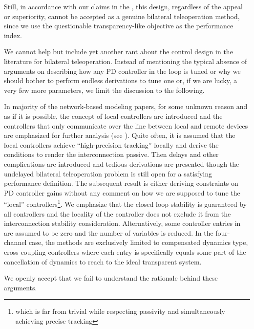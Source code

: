 Still, in accordance with our claims in the , this design, regardless of the appeal or superiority, cannot be accepted as 
a genuine bilateral teleoperation method, since we use the questionable transparency-like objective as the performance index.

We cannot help but include yet another rant about the control design in the literature for bilateral teleoperation. Instead of mentioning the typical 
absence of arguments on describing how any PD controller in the loop is tuned or why we should bother to perform endless derivations to tune one 
or, if we are lucky, a very few more parameters, we limit the discussion to the following. 

In majority of the network-based modeling papers, for some unknown reason and as if it is possible, the concept of local controllers are introduced 
and the controllers that only communicate over the line between local and remote devices are emphasized for further analysis (see ). 
Quite often, it is assumed that the local controllers achieve \enquote{high-precision tracking} locally and derive the conditions to render 
the interconnection passive. Then delays and other complications are introduced and tedious derivations are presented though the undelayed bilateral
teleoperation problem is still open for a satisfying performance definition. The subsequent result is either deriving constraints on PD controller 
gains without any comment on how we are supposed to tune the \enquote{local} controllers\footnote{which is far from trivial while respecting  
passivity and simultaneously achieving precise tracking}. We emphasize that the closed loop stability is guaranteed by all controllers and 
the locality of the controller does not exclude it from the interconnection stability consideration. Alternatively, some controller entries 
in  are assumed to be zero and the number of variables is reduced. In the four-channel case, the methods are exclusively 
limited to compensated dynamics type, cross-coupling controllers where each entry is specifically equals some part of the cancellation of 
dynamics to reach to the ideal transparent system. 

We openly accept that we fail to understand the rationale behind these arguments.

